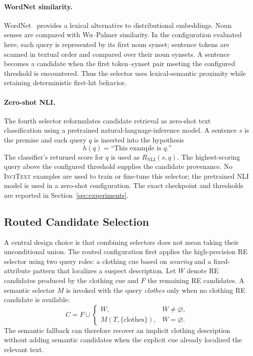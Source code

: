 \documentclass[sigconf,nonacm]{acmart}
\newcommand{\incitext}{\textsc{InciText}}
\begin{document}
\paragraph{WordNet similarity.}
WordNet~\cite{wordnet98} provides a lexical alternative to distributional
embeddings.  Noun senses are compared with Wu--Palmer similarity.  In the
configuration evaluated here, each query is represented by its first noun
synset; sentence tokens are scanned in textual order and compared over their
noun synsets.  A sentence becomes a candidate when the first token--synset pair
meeting the configured threshold is encountered.  Thus the selector uses
lexical-semantic proximity while retaining deterministic first-hit behavior.

\paragraph{Zero-shot NLI.}
The fourth selector reformulates candidate retrieval as zero-shot text
classification using a pretrained natural-language-inference model\cite{yin2019benchmarking}.  A
sentence $s$ is the premise and each query $q$ is inserted into the hypothesis
\begin{equation}
h(q)=\text{``This example is }q\text{.''}
\label{eq:nli-template}
\end{equation}
The classifier's returned score for $q$ is used as
$R_{\mathrm{NLI}}(s,q)$.  The highest-scoring query above the configured
threshold supplies the candidate provenance.  No \incitext{} examples are used
to train or fine-tune this selector; the pretrained NLI model is used in a
zero-shot configuration.  The exact checkpoint and thresholds are reported in
Section~\ref{sec:experiments}.

\subsection{Routed Candidate Selection}
\label{subsec:stacked-routing}

A central design choice is that combining selectors does not mean taking their
unconditional union.  The routed configuration first applies the high-precision
RE selector using two query roles: a clothing cue based on \emph{wearing} and a
fixed-attribute pattern that localizes a suspect description.  Let $W$ denote
RE candidates produced by the clothing cue and $F$ the remaining RE candidates.
A semantic selector $M$ is invoked with the query \emph{clothes} only when no
clothing RE candidate is available:
\begin{equation}
C = F \cup
\begin{cases}
W, & W\neq\varnothing,\\
M(T,\{\text{clothes}\}), & W=\varnothing.
\end{cases}
\label{eq:stacked-routing}
\end{equation}
The semantic fallback can therefore recover an implicit clothing description
without adding semantic candidates when the explicit cue already localized the
relevant text.
\end{document}
